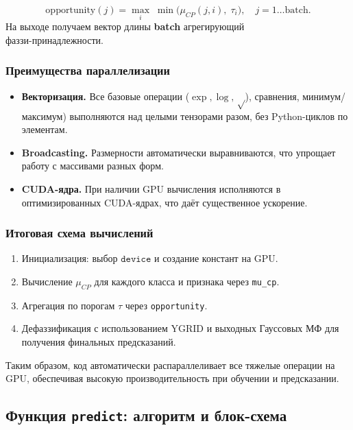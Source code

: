\begin{definition}
\[
  \mathrm{opportunity}(j) 
  = \max_{i}\;\min\bigl(\mu_{CP}(j,i),\;\tau_i\bigr),
  \quad j=1\ldots\text{batch}.
\]
На выходе получаем вектор длины \textbf{batch} агрегирующий \\ фаззи-принадлежности.
\end{definition}

\subsubsection{Преимущества параллелизации}

\begin{itemize}
  \item \textbf{Векторизация.} Все базовые операции ($\exp, \log, \sqrt$), сравнения, минимум/максимум) выполняются над целыми тензорами разом, без Python-циклов по элементам.
  \item \textbf{Broadcasting.} Размерности автоматически выравниваются, что упрощает работу с массивами разных форм.
  \item \textbf{CUDA-ядра.} При наличии GPU вычисления исполняются в оптимизированных CUDA-ядрах, что даёт существенное ускорение.
\end{itemize}

\subsubsection{Итоговая схема вычислений}

\begin{enumerate}
  \item Инициализация: выбор \(\texttt{device}\) и создание констант на GPU.
  \item Вычисление \(\mu_{CP}\) для каждого класса и признака через \verb|mu_cp|.
  \item Агрегация по порогам \(\tau\) через \verb|opportunity|.
  \item Дефаззификация с использованием \(\mathrm{YGRID}\) и выходных Гауссовых МФ для получения финальных предсказаний.
\end{enumerate}

Таким образом, код автоматически распараллеливает все тяжелые операции на GPU, обеспечивая высокую производительность при обучении и предсказании.


\subsection{Функция \texttt{predict}: алгоритм и блок-схема}

